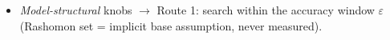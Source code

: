 \begin{itemize}
    \item \emph{Model-structural} knobs $\to$ Route 1: search within the accuracy window $\varepsilon$ (Rashomon set = implicit base assumption, never measured). 

\end{itemize}
